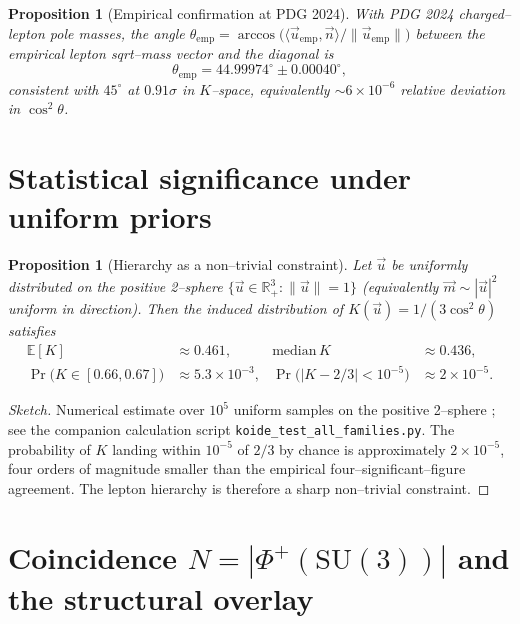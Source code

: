 \documentclass[11pt,a4paper]{article}
\newtheorem{proposition}[theorem]{Proposition}
\theoremstyle{remark}
\begin{document}
\begin{proposition}[Empirical confirmation at PDG 2024]
\label{prop:empirical}
With PDG 2024 charged--lepton pole masses, the angle $\theta_{\mathrm{emp}} = \arccos\big(\langle \vec u_{\mathrm{emp}}, \vec n\rangle / \|\vec u_{\mathrm{emp}}\|\big)$ between the empirical lepton sqrt--mass vector and the diagonal is
\begin{equation}
\theta_{\mathrm{emp}} = 44.99974^\circ \pm 0.00040^\circ,
\end{equation}
consistent with $45^\circ$ at $0.91\sigma$ in $K$--space, equivalently $\sim 6 \times 10^{-6}$ relative deviation in $\cos^2\theta$.
\end{proposition}

\section{Statistical significance under uniform priors}

\begin{proposition}[Hierarchy as a non--trivial constraint]
\label{prop:significance}
Let $\vec u$ be uniformly distributed on the positive 2--sphere $\{\vec u \in \mathbb{R}^3_+ : \|\vec u\| = 1\}$ (equivalently $\vec m \sim |\vec u|^2$ uniform in direction). Then the induced distribution of $K(\vec u) = 1/(3\cos^2\theta)$ satisfies
\begin{align}
\mathbb{E}[K] &\approx 0.461, & \mathrm{median}\,K &\approx 0.436, \\
\Pr\big(K \in [0.66, 0.67]\big) &\approx 5.3 \times 10^{-3}, & \Pr\big(|K - 2/3| < 10^{-5}\big) &\approx 2 \times 10^{-5}.
\end{align}
\end{proposition}

\begin{proof}[Sketch]
Numerical estimate over $10^5$ uniform samples on the positive 2--sphere ; see the companion calculation script \texttt{koide\_test\_all\_families.py}. The probability of $K$ landing within $10^{-5}$ of $2/3$ by chance is approximately $2 \times 10^{-5}$, four orders of magnitude smaller than the empirical four--significant--figure agreement. The lepton hierarchy is therefore a sharp non--trivial constraint.
\end{proof}

\section{Coincidence $N = |\Phi^+(\mathrm{SU}(3))|$ and the structural overlay}
\end{document}
